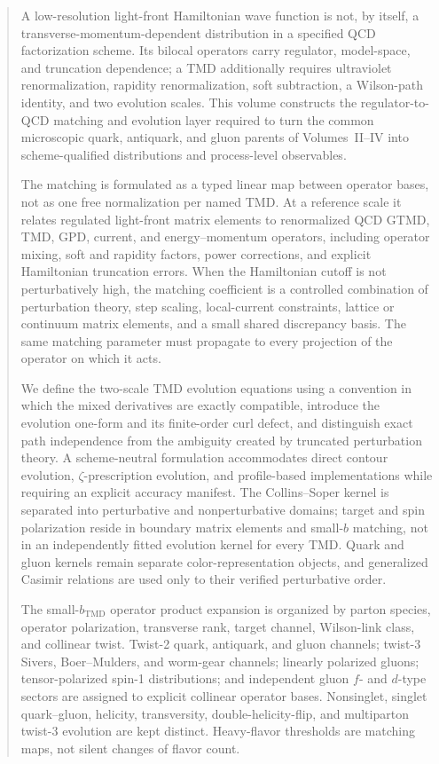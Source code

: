 \documentclass[11pt]{article}
\begin{document}
\begin{abstract}
A low-resolution light-front Hamiltonian wave function is not, by itself, a
transverse-momentum-dependent distribution in a specified QCD factorization
scheme.  Its bilocal operators carry regulator, model-space, and truncation
dependence; a TMD additionally requires ultraviolet renormalization, rapidity
renormalization, soft subtraction, a Wilson-path identity, and two evolution
scales.  This volume constructs the regulator-to-QCD matching and evolution
layer required to turn the common microscopic quark, antiquark, and gluon
parents of Volumes~II--IV into scheme-qualified distributions and
process-level observables.

The matching is formulated as a typed linear map between operator bases,
not as one free normalization per named TMD.  At a reference scale it relates
regulated light-front matrix elements to renormalized QCD GTMD, TMD, GPD,
current, and energy--momentum operators, including operator mixing, soft and
rapidity factors, power corrections, and explicit Hamiltonian truncation
errors.  When the Hamiltonian cutoff is not perturbatively high, the matching
coefficient is a controlled combination of perturbation theory, step scaling,
local-current constraints, lattice or continuum matrix elements, and a small
shared discrepancy basis.  The same matching parameter must propagate to
every projection of the operator on which it acts.

We define the two-scale TMD evolution equations using a convention in which
the mixed derivatives are exactly compatible, introduce the evolution
one-form and its finite-order curl defect, and distinguish exact path
independence from the ambiguity created by truncated perturbation theory.  A
scheme-neutral formulation accommodates direct contour evolution,
\(\zeta\)-prescription evolution, and profile-based implementations while
requiring an explicit accuracy manifest.  The Collins--Soper kernel is
separated into perturbative and nonperturbative domains; target and spin
polarization reside in boundary matrix elements and small-\(b\) matching,
not in an independently fitted evolution kernel for every TMD.  Quark and
gluon kernels remain separate color-representation objects, and generalized
Casimir relations are used only to their verified perturbative order.

The small-\(b_{\mathrm{TMD}}\) operator product expansion is organized by
parton species, operator polarization, transverse rank, target channel,
Wilson-link class, and collinear twist.  Twist-2 quark, antiquark, and gluon
channels; twist-3 Sivers, Boer--Mulders, and worm-gear channels; linearly
polarized gluons; tensor-polarized spin-1 distributions; and independent
gluon \(f\)- and \(d\)-type sectors are assigned to explicit collinear
operator bases.  Nonsinglet, singlet quark--gluon, helicity, transversity,
double-helicity-flip, and multiparton twist-3 evolution are kept distinct.
Heavy-flavor thresholds are matching maps, not silent changes of flavor
count.


\end{abstract}
\end{document}
